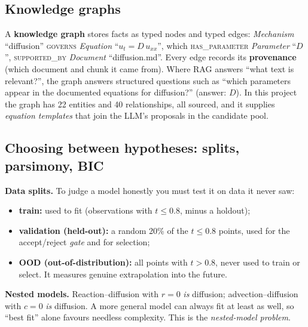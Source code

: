 \subsection{Knowledge graphs}

A \textbf{knowledge graph} stores facts as typed nodes and typed edges: \emph{Mechanism} ``diffusion''
\textsc{governs} \emph{Equation} ``$u_t=D\,u_{xx}$'', which \textsc{has\_parameter} \emph{Parameter} ``$D$'',
\textsc{supported\_by} \emph{Document} ``diffusion.md''. Every edge records its \textbf{provenance} (which
document and chunk it came from). Where RAG answers ``what text is relevant?'', the graph answers structured
questions such as ``which parameters appear in the documented equations for diffusion?'' (answer: $D$). In this
project the graph has 22 entities and 40 relationships, all sourced, and it supplies \emph{equation templates}
that join the LLM's proposals in the candidate pool.

\subsection{Choosing between hypotheses: splits, parsimony, BIC}\label{sec:selection}

\textbf{Data splits.} To judge a model honestly you must test it on data it never saw:
\begin{itemize}
  \item \textbf{train:} used to fit (observations with $t \le 0.8$, minus a holdout);
  \item \textbf{validation (held-out):} a random 20\% of the $t\le0.8$ points, used for the accept/reject
        \emph{gate} and for selection;
  \item \textbf{OOD (out-of-distribution):} all points with $t>0.8$, never used to train or select. It
        measures genuine extrapolation into the future.
\end{itemize}

\textbf{Nested models.} Reaction--diffusion with $r=0$ \emph{is} diffusion; advection--diffusion with $c=0$
\emph{is} diffusion. A more general model can always fit at least as well, so ``best fit'' alone favours
needless complexity. This is the \emph{nested-model problem}.

